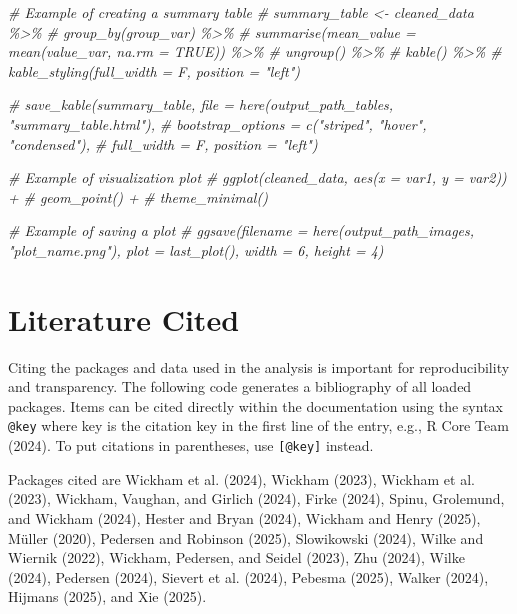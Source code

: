 \documentclass[
]{article}
\newenvironment{Shaded}{\begin{snugshade}}{\end{snugshade}}
\newcommand{\CommentTok}[1]{\textcolor[rgb]{0.56,0.35,0.01}{\textit{#1}}}
\begin{document}
\begin{Shaded}
\begin{Highlighting}[]
\CommentTok{\# Example of creating a summary table }
\CommentTok{\# summary\_table \textless{}{-} cleaned\_data \%\textgreater{}\%}
\CommentTok{\#   group\_by(group\_var) \%\textgreater{}\%}
\CommentTok{\#   summarise(mean\_value = mean(value\_var, na.rm = TRUE)) \%\textgreater{}\%}
\CommentTok{\#   ungroup() \%\textgreater{}\%}
\CommentTok{\#   kable() \%\textgreater{}\%}
\CommentTok{\#   kable\_styling(full\_width = F, position = "left") }

\CommentTok{\# save\_kable(summary\_table, file = here(output\_path\_tables, "summary\_table.html"),}
\CommentTok{\#   bootstrap\_options = c("striped", "hover", "condensed"),}
\CommentTok{\#   full\_width = F, position = "left")}
\end{Highlighting}
\end{Shaded}

\begin{Shaded}
\begin{Highlighting}[]
\CommentTok{\# Example of visualization plot}
\CommentTok{\# ggplot(cleaned\_data, aes(x = var1, y = var2)) +}
\CommentTok{\#   geom\_point() +}
\CommentTok{\#   theme\_minimal()}

\CommentTok{\# Example of saving a plot}
\CommentTok{\# ggsave(filename = here(output\_path\_images, "plot\_name.png"), plot = last\_plot(), width = 6, height = 4)}
\end{Highlighting}
\end{Shaded}

\section{Literature Cited}\label{literature-cited}

Citing the packages and data used in the analysis is important for
reproducibility and transparency. The following code generates a
bibliography of all loaded packages. Items can be cited directly within
the documentation using the syntax \texttt{@key} where key is the
citation key in the first line of the entry, e.g., R Core Team (2024).
To put citations in parentheses, use \texttt{{[}@key{]}} instead.

Packages cited are Wickham et al. (2024), Wickham (2023), Wickham et al.
(2023), Wickham, Vaughan, and Girlich (2024), Firke (2024), Spinu,
Grolemund, and Wickham (2024), Hester and Bryan (2024), Wickham and
Henry (2025), Müller (2020), Pedersen and Robinson (2025), Slowikowski
(2024), Wilke and Wiernik (2022), Wickham, Pedersen, and Seidel (2023),
Zhu (2024), Wilke (2024), Pedersen (2024), Sievert et al. (2024),
Pebesma (2025), Walker (2024), Hijmans (2025), and Xie (2025).
\end{document}
